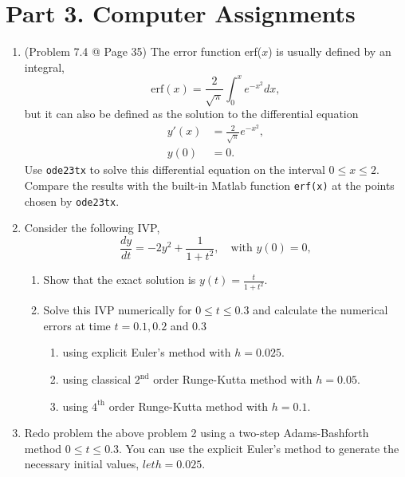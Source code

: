 \documentclass[10pt]{report}
\newcommand{\dintt}[4] {\int_{#1}^{#2} #3 d#4}
\begin{document}
\section*{Part 3. Computer Assignments}
\begin{enumerate}
	\item 
	(Problem 7.4 @ Page 35) The error function erf($x$) is usually defined by an integral,
	\[
	\text{erf}(x) = \frac{2}{\sqrt{\pi}} \dintt{0}{x}{e^{-x^2}}{x},
	\]
	but it can also be defined as the solution to the differential equation
	\begin{align*}
		y'(x) &= \frac{2}{\sqrt{\pi}}e^{-x^2},\\
		y(0) &= 0.
	\end{align*}
	Use \texttt{ode23tx} to solve this differential equation on the interval $0 \le x \le 2$. Compare the results with the built-in Matlab function \texttt{erf(x)} at the points chosen by \texttt{ode23tx}.
	
	\item 
	Consider the following IVP,
	\[
	\frac{dy}{dt} = -2y^2 + \frac{1}{1+t^2},\quad \text{with } y(0) = 0,
	\]
	\begin{enumerate}
		\item 
		Show that the exact solution is $y(t) = \frac{t}{1+t^2}$.
		
		\item 
		Solve this IVP numerically for $0 \le t \le 0.3$ and calculate the numerical errors at time $t=0.1, 0.2$ and $0.3$
		\begin{enumerate}
			\item 
			using explicit Euler’s method with $h=0.025$.
			
			\item 
			using classical $2^{\text{nd}}$ order Runge-Kutta method with $h=0.05$.
			
			\item 
			using $4^{\text{th}}$ order Runge-Kutta method with $h=0.1$.
		\end{enumerate}
	\end{enumerate}
	
	\item 
	Redo problem the above problem 2 using a two-step Adams-Bashforth method
	$0 \le t \le 0.3$. You can use the explicit Euler's method to generate the necessary initial values, $let h=0.025$.
\end{enumerate}
\end{document}
